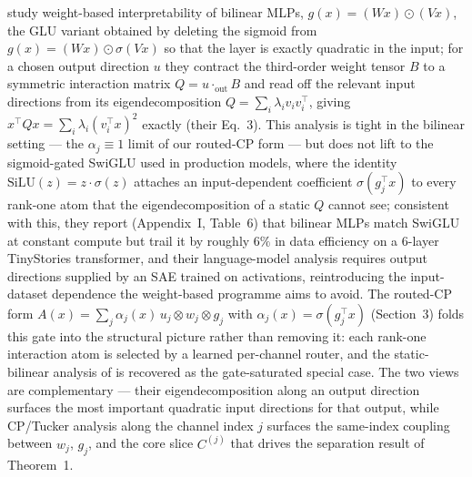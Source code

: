 \citet{pearce2024bilinear} study weight-based interpretability of bilinear
MLPs, $g(x) = (Wx) \odot (Vx)$, the GLU variant obtained by deleting the
sigmoid from $g(x) = (Wx) \odot \sigma(Vx)$ so that the layer is exactly
quadratic in the input; for a chosen output direction $u$ they contract the
third-order weight tensor $B$ to a symmetric interaction matrix
$Q = u \cdot_{\text{out}} B$ and read off the relevant input directions
from its eigendecomposition $Q = \sum_i \lambda_i v_i v_i^{\top}$, giving
$x^{\top} Q x = \sum_i \lambda_i (v_i^{\top} x)^2$ exactly (their Eq.~3).
This analysis is tight in the bilinear setting --- the $\alpha_j \equiv 1$
limit of our routed-CP form --- but does not lift to the sigmoid-gated
SwiGLU used in production models, where the identity
$\mathrm{SiLU}(z) = z \cdot \sigma(z)$ attaches an input-dependent
coefficient $\sigma(g_j^{\top} x)$ to every rank-one atom that the
eigendecomposition of a static $Q$ cannot see; consistent with this, they
report (Appendix~I, Table~6) that bilinear MLPs match SwiGLU at constant
compute but trail it by roughly $6\%$ in data efficiency on a $6$-layer
TinyStories transformer, and their language-model analysis requires output
directions supplied by an SAE trained on activations, reintroducing the
input-dataset dependence the weight-based programme aims to avoid. The
routed-CP form
$A(x) = \sum_j \alpha_j(x)\, u_j \otimes w_j \otimes g_j$ with
$\alpha_j(x) = \sigma(g_j^{\top} x)$ (Section~3) folds this gate into the
structural picture rather than removing it: each rank-one interaction atom
is selected by a learned per-channel router, and the static-bilinear
analysis of \citet{pearce2024bilinear} is recovered as the gate-saturated
special case. The two views are complementary --- their eigendecomposition
along an output direction surfaces the most important quadratic input
directions for that output, while CP/Tucker analysis along the channel
index $j$ surfaces the same-index coupling between $w_j$, $g_j$, and the
core slice $C^{(j)}$ that drives the separation result of Theorem~1.

%
